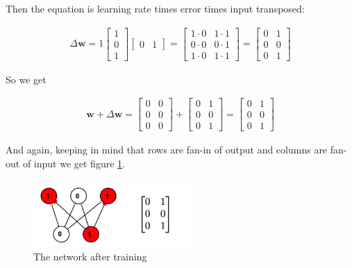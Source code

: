 Then the equation is learning rate times error times input transposed:

\begin{align*}
\Delta \mathbf{w}  = 1
\begin{bmatrix} 1 \\ 0 \\ 1 \end{bmatrix} 
\begin{bmatrix} 0 & 1 \end{bmatrix} 
= \begin{bmatrix} 1 \cdot 0 & 1 \cdot 1 \\ 0 \cdot 0 & 0 \cdot 1 \\ 1 \cdot 0 & 1 \cdot 1 \end{bmatrix} 
= \begin{bmatrix} 0 & 1 \\ 0 & 0 \\  0 & 1  \end{bmatrix}
\end{align*}

So we get

\begin{align*}
\mathbf{w} + \Delta \mathbf{w}  =
\begin{bmatrix} 0 & 0 \\ 0 & 0 \\  0  & 0  \end{bmatrix} +
\begin{bmatrix} 0 & 1 \\ 0 & 0 \\  0  & 1  \end{bmatrix} =
\begin{bmatrix} 0 & 1 \\ 0 & 0 \\  0  & 1  \end{bmatrix}
\end{align*}

And again, keeping in mind that rows are fan-in of output and columns are fan-out of input we get figure \ref{lms_vector_2}.

\begin{figure}[h]
\centering
\includegraphics[width=0.55\textwidth]{images/vectorLMSAfterTrain.png}
\caption[Jeff Yoshimi.]{The network after training}
\label{lms_vector_2}
\end{figure}


